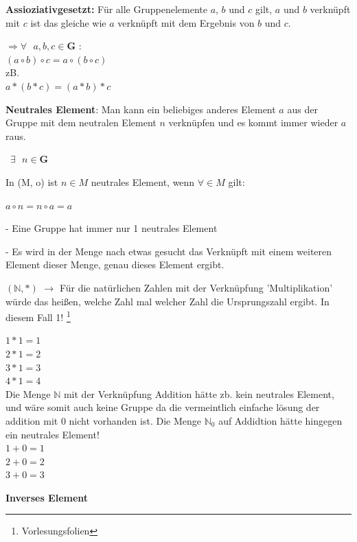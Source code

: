 \documentclass[a4paper,12pt]{scrartcl}
\begin{document}
\textbf{Assioziativgesetzt:} Für alle Gruppenelemente $a$, $b$ und $c$ gilt, $a$ und $b$ verknüpft mit $c$ ist das gleiche wie $a$ verknüpft mit dem Ergebnis von $b$ und $c$.
\begin{center}
$\Rightarrow \forall \text{  }  a, b, c \in \textbf{G}$ :\\
 $(a\circ b) \circ c = a \circ (b \circ c)$\\
 zB.\\
$a * (b *c) = (a * b) * c$
\end{center}
\textbf{Neutrales Element}: Man kann ein beliebiges anderes Element $a$ aus der Gruppe mit dem neutralen Element $n$ verknüpfen und es kommt immer wieder $a$ raus. 
\begin{center}\
$\exists \text{ } n \in \textbf{G}$ 
\end{center}
In (M, o) ist $n \in M$ neutrales Element, wenn $\forall \in M$ gilt:\\
\begin{center}
$a \circ n = n \circ a = a$
\end{center}
\begin{description}
 \item - Eine Gruppe hat immer nur 1 neutrales Element
 \item - Es wird in der Menge nach etwas gesucht das Verknüpft mit einem weiteren Element dieser Menge, genau dieses Element ergibt.
 \end{description}
  \begin{center}
$(\mathbb{N, *})$ $\rightarrow$ Für die natürlichen Zahlen mit der Verknüpfung 'Multiplikation' würde das heißen, welche Zahl mal welcher Zahl die Ursprungszahl ergibt. In diesem Fall 1! \footnote{Vorlesungsfolien}

 $1 * 1 = 1$\\
 $2 * 1 = 2$\\
 $3 * 1 = 3$\\
 $4 * 1 = 4$\\
 
 Die Menge $\mathbb{N}$ mit der Verknüpfung Addition hätte zb. kein neutrales Element, und wäre somit auch keine Gruppe da die vermeintlich einfache lösung der addition mit $0$ nicht vorhanden ist.
 Die Menge $\mathbb{N}_{0}$ auf Addidtion hätte hingegen ein neutrales Element!\\
 $1 + 0 = 1$\\
 $2 + 0 = 2$\\
 $3 + 0 = 3$\\
 
\end{center}
 \textbf{Inverses Element}
\end{document}
